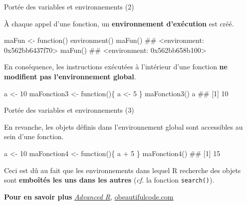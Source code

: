 \documentclass[12pt,ignorenonframetext,]{beamer}
\newenvironment{Shaded}{}{}
\newcommand{\KeywordTok}[1]{\textcolor[rgb]{0.00,0.00,1.00}{#1}}
\newcommand{\DecValTok}[1]{#1}
\newcommand{\StringTok}[1]{\textcolor[rgb]{0.00,0.50,0.50}{#1}}
\newcommand{\ControlFlowTok}[1]{\textcolor[rgb]{0.00,0.00,1.00}{#1}}
\newcommand{\OperatorTok}[1]{#1}
\newcommand{\NormalTok}[1]{#1}
\renewenvironment{Shaded}{\begin{snugshade}}{\end{snugshade}}
\begin{document}
\begin{frame}[fragile]{\large Portée des variables et environnements
(2)}

\small
À chaque appel d'une fonction, un \textbf{environnement d'exécution} est
créé.

\footnotesize

\begin{Shaded}
\begin{Highlighting}[]
\NormalTok{maFun <-}\StringTok{ }\ControlFlowTok{function}\NormalTok{() }\KeywordTok{environment}\NormalTok{()}
\KeywordTok{maFun}\NormalTok{()}
\NormalTok{  ## <environment: 0x562bb6437f70>}
\KeywordTok{maFun}\NormalTok{()}
\NormalTok{  ## <environment: 0x562bb658b100>}
\end{Highlighting}
\end{Shaded}

\pause \small
En conséquence, les instructions exécutées à l'intérieur d'une fonction
\textbf{ne modifient pas l'environnement global}.

\footnotesize

\begin{Shaded}
\begin{Highlighting}[]
\NormalTok{a <-}\StringTok{ }\DecValTok{10}
\NormalTok{maFonction3 <-}\StringTok{ }\ControlFlowTok{function}\NormalTok{()\{}
\NormalTok{  a <-}\StringTok{ }\DecValTok{5}
\NormalTok{\}}
\KeywordTok{maFonction3}\NormalTok{()}
\NormalTok{a}
\NormalTok{  ## [1] 10}
\end{Highlighting}
\end{Shaded}

\end{frame}

\begin{frame}[fragile]{\large Portée des variables et environnements
(3)}

En revanche, les objets définis dans l'environnement global sont
accessibles au sein d'une fonction.

\footnotesize

\begin{Shaded}
\begin{Highlighting}[]
\NormalTok{a <-}\StringTok{ }\DecValTok{10}
\NormalTok{maFonction4 <-}\StringTok{ }\ControlFlowTok{function}\NormalTok{()\{}
\NormalTok{  a }\OperatorTok{+}\StringTok{ }\DecValTok{5}
\NormalTok{\}}
\KeywordTok{maFonction4}\NormalTok{()}
\NormalTok{  ## [1] 15}
\end{Highlighting}
\end{Shaded}

\pause \normalsize
Ceci est dû au fait que les environnements dans lequel R recherche des
objets sont \textbf{emboîtés les uns dans les autres} (\textit{cf.} la
fonction \texttt{search()}).

\textbf{Pour en savoir plus}
\href{http://adv-r.had.co.nz/Environments.html\#function-envs}{\underline{\textit{Advanced R}}},
\href{http://blog.obeautifulcode.com/R/How-R-Searches-And-Finds-Stuff/}{\underline{obeautifulcode.com}}

\end{frame}
\end{document}
